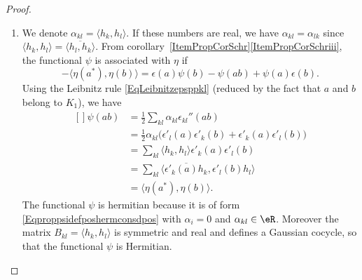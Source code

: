 \begin{proof}
	\begin{enumerate}
		\item
		      We denote $\alpha_{kl}=\langle h_k, h_l\rangle $. If these numbers are real, we have $\alpha_{kl}=\alpha_{lk}$ since $\langle h_k, h_l\rangle =\overline{ \langle h_l, h_k\rangle  }$. From corollary~\ref{ItemPropCorSchr}\ref{ItemPropCorSchriii}, the functional $\psi$ is associated with $\eta$ if
		      \begin{equation}
			      -\langle \eta(a^*), \eta(b)\rangle =\epsilon(a)\psi(b)-\psi(ab)+\psi(a)\epsilon(b).
		      \end{equation}
		      Using the Leibnitz rule \eqref{EqLeibnitzepsppkl} (reduced by the fact that $a$ and $b$ belong to $K_1$), we have
		      \begin{equation}
			      \begin{aligned}[]
				      \psi(ab) & =\frac{ 1 }{2}\sum_{kl}\alpha_{kl}\epsilon_{kl}''(ab)                                          \\
				               & =\frac{ 1 }{2}\alpha_{kl}\big( \epsilon'_l(a)\epsilon'_k(b)+\epsilon'_k(a)\epsilon'_l(b) \big) \\
				               & =\sum_{kl}\langle h_k, h_l\rangle \epsilon'_k(a)\epsilon'_l(b)                                 \\
				               & =\sum_{kl}\langle \overline{ \epsilon'_k(a)h_k }, \epsilon'_l(b)h_l\rangle                     \\
				               & =\langle \eta(a^*), \eta(b)\rangle .
			      \end{aligned}
		      \end{equation}
		      The functional $\psi$ is hermitian because it is of form \eqref{Eqproppsidefposhermconsdpos} with $\alpha_i=0$ and $\alpha_{kl}\in\eR$. Moreover the matrix $B_{kl}=\langle h_k, h_l\rangle $ is symmetric and real and defines a Gaussian cocycle, so that the functional $\psi$ is Hermitian.


\end{enumerate}
\end{proof}
